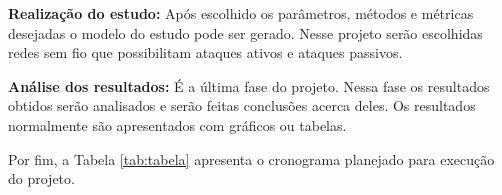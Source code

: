 \documentclass[
	article,			%
	11pt,				%
	oneside,			%
	a4paper,			%
	english,			%
	brazil,				%
	sumario=tradicional
	]{abntex2}
\begin{document}
\textbf{Realização do estudo:}
Após escolhido os parâmetros, métodos e métricas desejadas o modelo do estudo pode ser gerado. Nesse projeto serão escolhidas redes sem fio que possibilitam ataques ativos e ataques passivos. 

\textbf{Análise dos resultados:}
É a última fase do projeto. Nessa fase os resultados
obtidos serão analisados e serão feitas conclusões acerca deles. Os resultados normalmente são apresentados com gráficos ou tabelas.

Por fim, a Tabela \ref{tab:tabela} apresenta o cronograma planejado para execução do projeto.
\begin{table}[h]
\caption{Cronograma de atividades.\label{tab:tabela}}
\end{table}




\end{document}

